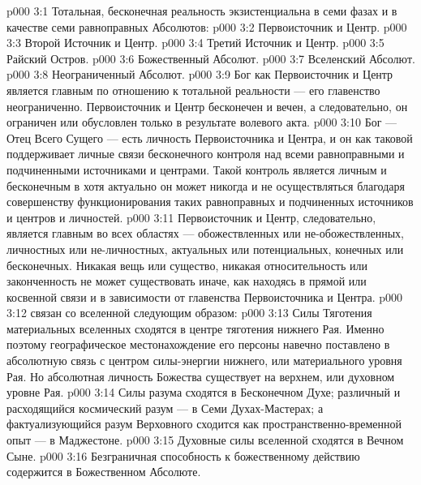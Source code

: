 \vs p000 3:1 Тотальная, бесконечная реальность экзистенциальна в семи фазах и в качестве семи равноправных Абсолютов:
\vs p000 3:2 \bibnobreakspace Первоисточник и Центр.
\vs p000 3:3 \bibnobreakspace Второй Источник и Центр.
\vs p000 3:4 \bibnobreakspace Третий Источник и Центр.
\vs p000 3:5 \bibnobreakspace Райский Остров.
\vs p000 3:6 \bibnobreakspace Божественный Абсолют.
\vs p000 3:7 \bibnobreakspace Вселенский Абсолют.
\vs p000 3:8 \bibnobreakspace Неограниченный Абсолют.
\vs p000 3:9 \pc Бог как Первоисточник и Центр является главным по отношению к тотальной реальности --- его главенство неограниченно. Первоисточник и Центр бесконечен и вечен, а следовательно, он ограничен или обусловлен только в результате волевого акта.
\vs p000 3:10 Бог --- Отец Всего Сущего --- есть личность Первоисточника и Центра, и он как таковой поддерживает личные связи бесконечного контроля над всеми равноправными и подчиненными источниками и центрами. Такой контроль является личным и бесконечным в  хотя актуально он может никогда и не осуществляться благодаря совершенству функционирования таких равноправных и подчиненных источников и центров и личностей.
\vs p000 3:11 Первоисточник и Центр, следовательно, является главным во всех областях --- обожествленных или не\hyp{}обожествленных, личностных или не\hyp{}личностных, актуальных или потенциальных, конечных или бесконечных. Никакая вещь или существо, никакая относительность или законченность не может существовать иначе, как находясь в прямой или косвенной связи и в зависимости от главенства Первоисточника и Центра.
\vs p000 3:12 \pc {} связан со вселенной следующим образом:
\vs p000 3:13 \bibnobreakspace Силы Тяготения материальных вселенных сходятся в центре тяготения нижнего Рая. Именно поэтому географическое местонахождение его персоны навечно поставлено в абсолютную связь с центром силы\hyp{}энергии нижнего, или материального уровня Рая. Но абсолютная личность Божества существует на верхнем, или духовном уровне Рая.
\vs p000 3:14 \bibnobreakspace Силы разума сходятся в Бесконечном Духе; различный и расходящийся космический разум --- в Семи Духах\hyp{}Мастерах; а фактуализующийся разум Верховного сходится как пространственно\hyp{}временной опыт --- в Маджестоне.
\vs p000 3:15 \bibnobreakspace Духовные силы вселенной сходятся в Вечном Сыне.
\vs p000 3:16 \bibnobreakspace Безграничная способность к божественному действию содержится в Божественном Абсолюте.
